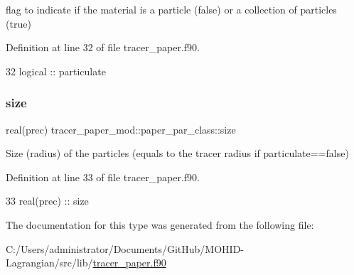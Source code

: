 flag to indicate if the material is a particle (false) or a collection of particles (true) 



Definition at line 32 of file tracer\+\_\+paper.\+f90.


\begin{DoxyCode}
32         \textcolor{keywordtype}{logical}    :: particulate
\end{DoxyCode}
\mbox{\label{structtracer__paper__mod_1_1paper__par__class_aeb0b4d046983cd2f631822e80e1600c4}} 
\subsubsection{\texorpdfstring{size}{size}}
{\footnotesize\ttfamily real(prec) tracer\+\_\+paper\+\_\+mod\+::paper\+\_\+par\+\_\+class\+::size\hspace{0.3cm}{\ttfamily [private]}}



Size (radius) of the particles (equals to the tracer radius if particulate==false) 



Definition at line 33 of file tracer\+\_\+paper.\+f90.


\begin{DoxyCode}
33         \textcolor{keywordtype}{real(prec)} :: size
\end{DoxyCode}


The documentation for this type was generated from the following file\+:\begin{DoxyCompactItemize}
\item 
C\+:/\+Users/administrator/\+Documents/\+Git\+Hub/\+M\+O\+H\+I\+D-\/\+Lagrangian/src/lib/\mbox{\hyperlink{tracer__paper_8f90}{tracer\+\_\+paper.\+f90}}\end{DoxyCompactItemize}
